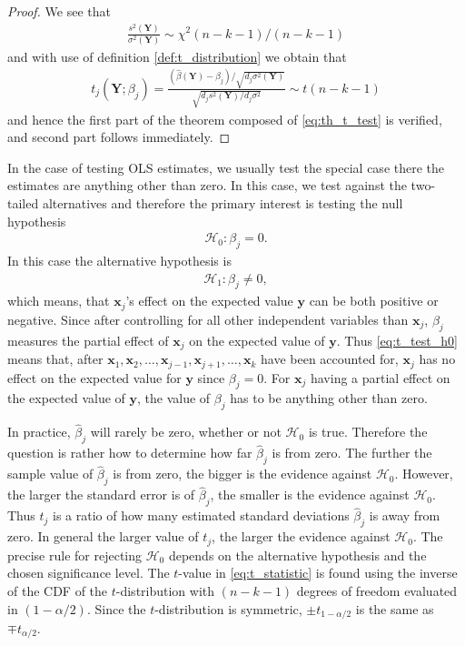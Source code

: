\begin{proof}
We see that
\begin{align*}
    \frac{s^2(\textbf{Y})}{\sigma^2(\textbf{Y})} \sim \chi^2(n-k-1)/(n-k-1)
\end{align*}
and with use of definition \ref{def:t_distribution} we obtain that
\begin{align*}
    t_j(\textbf{Y};\beta_j)=\frac{(\hat{\beta}(\textbf{Y})-\beta_j)/\sqrt{d_j\sigma^2(\textbf{Y})}}{\sqrt{d_js^2(\textbf{Y})/d_j\sigma^2}} \sim t(n-k-1)
\end{align*}
and hence the first part of the theorem composed of \eqref{eq:th_t_test} is verified, and second part follows immediately. 
\end{proof}

In the case of testing OLS estimates, we usually test the special case there the estimates are anything other than zero. In this case, we test against the two-tailed alternatives and therefore the primary interest is testing the null hypothesis
\begin{align} \label{eq:t_test_h0}
    \mathcal{H}_0:\beta_j=0.
\end{align}
In this case the alternative hypothesis is
\begin{align} \label{eq:t_test_ha}
    \mathcal{H}_1 : \beta_j \neq 0,
\end{align}
which means, that $\textbf{x}_j$'s effect on the expected value $\textbf{y}$ can be both positive or negative.
Since after controlling for all other independent variables than $\textbf{x}_j$, $\beta_j$ measures the partial effect of $\textbf{x}_j$ on the expected value of $\textbf{y}$. 
Thus \eqref{eq:t_test_h0} means that, after $\textbf{x}_1,\textbf{x}_2, \ldots, \textbf{x}_{j-1}, \textbf{x}_{j+1}, \ldots, \textbf{x}_k$ have been accounted for, $\textbf{x}_j$ has no effect on the expected value for $\textbf{y}$ since $\beta_j=0$. 
For $\textbf{x}_j$ having a partial effect on the expected value of $\textbf{y}$, the value of $\beta_j$ has to be anything other than zero.

In practice, $\hat{\beta}_j$ will rarely be zero, whether or not $\mathcal{H}_0$ is true.
Therefore the question is rather how to determine how far $\hat{\beta}_j$ is from zero. 
The further the sample value of $\hat{\beta}_j$ is from zero, the bigger is the evidence against $\mathcal{H}_0$. 
However, the larger the standard error is of $\hat{\beta}_j$, the smaller is the evidence against $\mathcal{H}_0$. 
Thus $t_{j}$ is a ratio of how many estimated standard deviations $\hat{\beta}_j$ is away from zero.
In general the larger value of $t_{j}$, the larger the evidence against $\mathcal{H}_0$. 
The precise rule for rejecting $\mathcal{H}_0$ depends on the alternative hypothesis and the chosen significance level.
The $t$-value in \eqref{eq:t_statistic} is found using the inverse of the CDF of the $t$-distribution with $(n - k - 1)$ degrees of freedom evaluated in $(1-\alpha/2)$. 
Since the $t$-distribution is symmetric, $\pm t_{1-\alpha/2}$ is the same as $\mp t_{\alpha/2}$.

